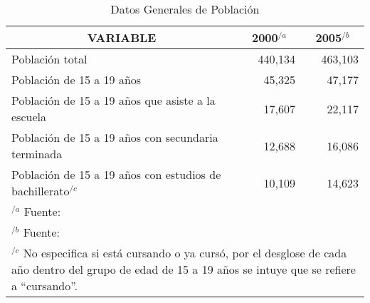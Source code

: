\begin{table}
	\centering
    \caption{Datos Generales de Poblaci\'on}
    \label{tbl:INEGI:PoblacionEstudiaIrapuato}
    \begin{tabular}{p{4in}|r|r}
        \multicolumn{1}{c|}{VARIABLE}
        	& \multicolumn{1}{c|}{2000$^{/a}$}
        	& \multicolumn{1}{c}{2005$^{/b}$} \\
        \hline \hline
        Poblaci\'on total & 440,134 & 463,103 \\
        Poblaci\'on de 15 a 19 a\~nos & 45,325 & 47,177 \\
        Poblaci\'on de 15 a 19 a\~nos que asiste a la escuela & 17,607 & 22,117 \\
        Poblaci\'on de 15 a 19 a\~nos con secundaria terminada & 12,688 & 16,086 \\
        Poblaci\'on de 15 a 19 a\~nos con estudios de bachillerato$^{/c}$ & 10,109 & 14,623 \\
        \hline
        \multicolumn{3}{l}{$^{/a}$ \footnotesize Fuente: \citep{Inegi2000}} \\
        \multicolumn{3}{l}{$^{/b}$ \footnotesize Fuente: \citep{Inegi2005}} \\
        \multicolumn{3}{p{5.4in}}{$^{/c}$ \footnotesize No especifica si est\'a cursando o ya curs\'o, por el desglose de cada a\~no dentro del grupo de edad de 15 a 19 a\~nos se intuye que se refiere a ``cursando''.}
    \end{tabular}
\end{table}

